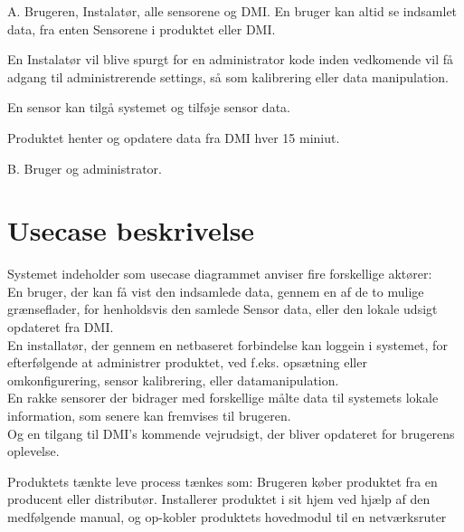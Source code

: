 A. Brugeren, Instalatør, alle sensorene og DMI.
En bruger kan altid se indsamlet data, fra enten Sensorene i produktet eller DMI.

En Instalatør vil blive spurgt for en administrator kode inden vedkomende vil få adgang til administrerende settings, så som kalibrering eller data manipulation.

En sensor kan tilgå systemet og tilføje sensor data.

Produktet henter og opdatere data fra DMI hver 15 miniut.

B. Bruger og administrator.


\section{Usecase beskrivelse}
Systemet indeholder som usecase diagrammet anviser fire forskellige aktører:\\
En bruger, der kan få vist den indsamlede data, gennem en af de to mulige grænseflader, for henholdsvis den samlede Sensor data, eller den lokale udsigt opdateret fra DMI.\\
En installatør, der gennem en netbaseret forbindelse kan loggein i systemet, for efterfølgende at administrer produktet, ved f.eks. opsætning eller omkonfigurering, sensor kalibrering, eller datamanipulation.\\
En rakke sensorer der bidrager med forskellige målte data til systemets lokale information, som senere kan fremvises til brugeren.\\
Og en tilgang til DMI's kommende vejrudsigt, der bliver opdateret for brugerens oplevelse.

Produktets tænkte leve process tænkes som:
Brugeren køber produktet fra en producent eller distributør.
Installerer produktet i sit hjem ved hjælp af den medfølgende manual, og op-kobler produktets hovedmodul til en netværksruter